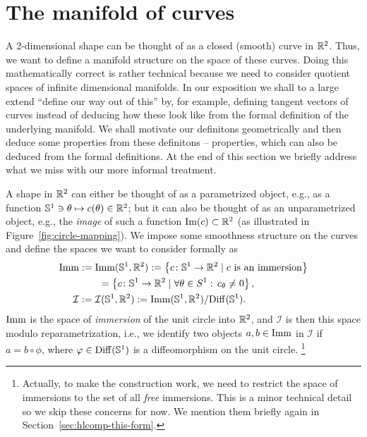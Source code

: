 \section{The manifold of curves}
\label{sec:manifold-curves}

A 2-dimensional shape can be thought of as a closed (smooth) curve in $\R^2$. Thus, we want to define a manifold structure on the space of these curves. Doing this mathematically correct is rather technical because we need to consider quotient spaces of infinite dimensional manifolds. In our exposition we shall to a large extend ``define our way out of this'' by, for example, defining tangent vectors of curves instead of deducing how these look like from the formal definition of the underlying manifold. We shall motivate our definitons geometrically and then deduce some properties from these definitons -- properties, which can also be deduced from the formal definitions. At the end of this section we briefly address what we miss with our more informal treatment.

A shape in $\R^2$ can either be thought of as a parametrized object, e.g., as a function $\S^1 \ni \theta \mapsto c(\theta) \in \R^2$; but it can also be thought of as an unparametrized object, e.g., the \textit{image} of such a function $\text{Im}(c) \subset \R^2$ (as illustrated in Figure~\ref{fig:circle-mapping}). We impose some smoothness structure on the curves and define the spaces we want to consider formally as
\begin{align*}
  \I & := \I(\S^1, \R^2)
       :=  \left\{ c\colon \S^1 \rightarrow \R^2 \mid c \text{ is an immersion} \right\} \\
     & \quad \quad = \left\{c\colon \S^1 \rightarrow \R^2 \mid \forall \theta \in S^1: \, c_{\theta} \not = 0 \right\}, \\
  \mathcal{I}
     & := \mathcal{I}(\S^1, \R^2)  := \I(\S^1, \R^2)/\mathrm{Diff}(\S^1).
\end{align*}
$\I$ is the space of \textit{immersion} of the unit circle into $\R^2$, and $\mathcal{I}$ is then this space modulo reparametrization, i.e., we identify two objects $a,b \in \I$ in $\mathcal{I}$ if $a=b \circ \phi$, where $\phi \in \mathrm{Diff}(\S^1)$ is a diffeomorphism on the unit circle.
\footnote{Actually, to make the construction work, we need to restrict the space of immersions to the set of all \textit{free} immersions. This is a minor technical detail so we skip these concerns for now. We mention them briefly again in Section~\ref{sec:hlcomp-this-form}.}

